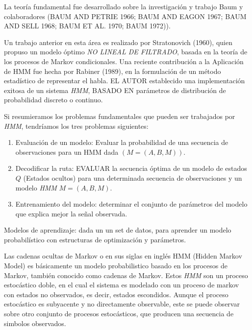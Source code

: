 






La teoría fundamental fue desarrollado sobre la investigación y trabajo  Baum y colaboradores (BAUM AND PETRIE 1966; BAUM AND EAGON 1967; BAUM AND SELL 1968; BAUM ET AL. 1970; BAUM 1972)). 

Un trabajo anterior en esta área es realizado por  Stratonovich (1960), quien propuso un modelo óptimo \emph{NO LINEAL DE FILTRADO}, basada en la teoría de los procesos de Markov condicionales. Una reciente contribución a la Aplicación de HMM fue hecha por Rabiner (1989), en la formulación de un método estadístico de representar el habla. EL AUTOR establecido una implementación exitosa de un sistema \emph{HMM}, BASADO EN parámetros de distribución de probabilidad discreto o continuo.



Si resumieramos los problemas fundamentales que pueden ser trabajados por \emph{HMM}, tendríamos los tres problemas siguientes:

\begin{enumerate}
	
	 \item Evaluación de un modelo: Evaluar la probabilidad de una secuencia de observaciones para un HMM dada  $(M = (A, B, M)).$


 \item Decodificar la ruta:  EVALUAR la secuencia óptima de un modelo de estados $Q$ (Estados ocultos) para una determinada secuencia de observaciones y un modelo \emph{HMM}  $M = (A, B, M).$

 \item  Entrenamiento del modelo:   determinar el conjunto de parámetros del modelo que explica mejor la señal observada.

\end{enumerate}


Modelos de aprendizaje: dada un un set de datos, para aprender un modelo probabilístico con estructuras de optimización y parámetros.






Las cadenas ocultas de Markov o en sus siglas en inglés HMM (Hidden Markov Model) es básicamente un modelo probabilistico basado en los procesos de Markov, también conocido como cadenas de Markov. Estos \emph{HMM} son un proceso estocástico doble, en el cual el sistema es modelado con un proceso de markov con estados no observados, es decir, estados escondidos. Aunque el proceso estocástico es subyacente y no directamente observable, este se puede observar sobre otro conjunto de procesos estocásticos, que producen una secuencia de simbolos observados.


